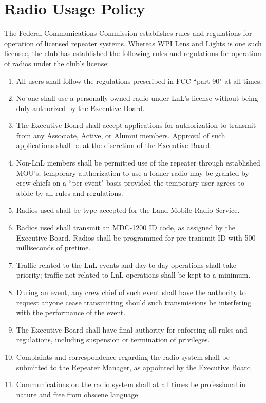 \documentclass[12pt,letterpaper]{book}
\begin{document}
\chapter{Radio Usage Policy}

The Federal Communications Commission establishes rules and regulations for operation of licensed repeater systems. Whereas WPI Lens and Lights is one such licensee, the club has established the following rules and regulations for operation of radios under the club's license:

\begin{enumerate}

\item All users shall follow the regulations prescribed in FCC ``part 90" at all times.
\item No one shall use a personally owned radio under LnL's license without being duly authorized by the Executive Board.
\item The Executive Board shall accept applications for authorization to transmit from any Associate, Active, or Alumni members. Approval of such applications shall be at the discretion of the Executive Board.
\item Non-LnL members shall be permitted use of the repeater through established MOU's; temporary authorization to use a loaner radio may be granted by crew chiefs on a ``per event" basis provided the temporary user agrees to abide by all rules and regulations.
\item Radios used shall be type accepted for the Land Mobile Radio Service.
\item Radios used shall transmit an MDC-1200 ID code, as assigned by the Executive Board. Radios shall be programmed for pre-transmit ID with 500 milliseconds of pretime.
\item Traffic related to the LnL events and day to day operations shall take priority; traffic not related to LnL operations shall be kept to a minimum.
\item During an event, any crew chief of such event shall have the authority to request anyone cease transmitting should such transmissions be interfering with the performance of the event.
\item The Executive Board shall have final authority for enforcing all rules and regulations, including suspension or termination of privileges.
\item Complaints and correspondence regarding the radio system shall be submitted to the Repeater Manager, as appointed by the Executive Board.
\item Communications on the radio system shall at all times be professional in nature and free from obscene language.

\end{enumerate}
\end{document}
